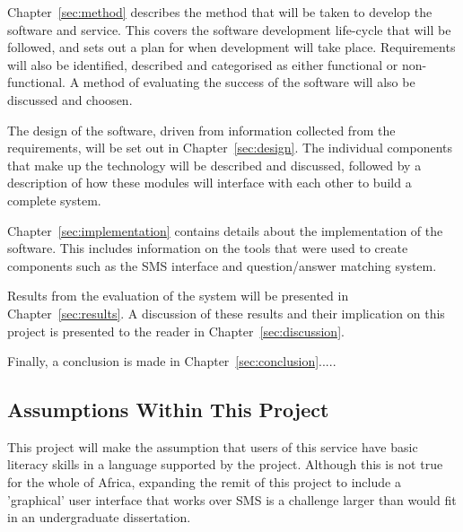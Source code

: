 \documentclass{article}
\begin{document}
Chapter~\ref{sec:method} describes the method that will be taken to develop the software and service.  This covers the software development life-cycle that will be followed, and sets out a plan for when development will take place.  Requirements will also be identified, described and categorised  as either functional or non-functional.  A method of evaluating the success of the software will also be discussed and choosen.

The design of the software, driven from information collected from the requirements, will be set out in Chapter~\ref{sec:design}.  The individual components that make up the technology will be described and discussed, followed by a description of how these modules will interface with each other to build a complete system.  

Chapter~\ref{sec:implementation} contains details about the implementation of the software.  This includes information on the tools that were used to create components such as the SMS interface and question/answer matching system.

Results from the evaluation of the system will be presented in Chapter~\ref{sec:results}.  A discussion of these results and their implication on this project is presented to the reader in Chapter~\ref{sec:discussion}.

Finally, a conclusion is made in Chapter~\ref{sec:conclusion}.....

\subsection{Assumptions Within This Project}
This project will make the assumption that users of this service have basic literacy skills in a language supported by the project.  Although this is not true for the whole of Africa, expanding the remit of this project to include a 'graphical' user interface that works over SMS is a challenge larger than would fit in an undergraduate dissertation.
\end{document}
